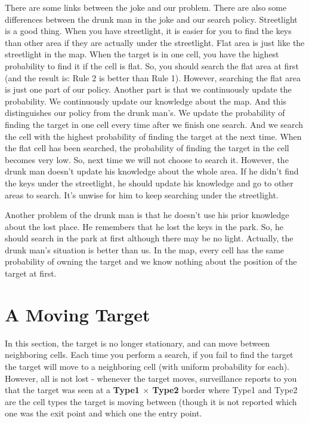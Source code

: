\documentclass[letter]{article}
\begin{document}
\begin{enumerate}
	\par{There are some links between the joke and our problem. There are also some differences between the drunk man in the joke and our search policy. Streetlight is a good thing. When you have streetlight, it is easier for you to find the keys than other area if they are actually under the streetlight. Flat area is just like the streetlight in the map. When the target is in one cell, you have the highest probability to find it if the cell is flat. So, you should search the flat area at first (and the result is: Rule 2 is better than Rule 1). However, searching the flat area is just one part of our policy. Another part is that we continuously update the probability. We continuously update our knowledge about the map. And this distinguishes our policy from the drunk man’s. We update the probability of finding the target in one cell every time after we finish one search. And we search the cell with the highest probability of finding the target at the next time. When the flat cell has been searched, the probability of finding the target in the cell becomes very low. So, next time we will not choose to search it. However, the drunk man doesn’t update his knowledge about the whole area. If he didn’t find the keys under the streetlight, he should update his knowledge and go to other areas to search. It’s unwise for him to keep searching under the streetlight.} 
	\par{Another problem of the drunk man is that he doesn’t use his prior knowledge about the lost place. He remembers that he lost the keys in the park. So, he should search in the park at first although there may be no light. Actually, the drunk man’s situation is better than us. In the map, every cell has the same probability of owning the target and we know nothing about the position of the target at first.}
	
\end{enumerate}

\section{A Moving Target}
\label{sec:A Moving Target}
\par{In this section, the target is no longer stationary, and can move between neighboring cells. Each time you perform
	a search, if you fail to find the target the target will move to a neighboring cell (with uniform probability for each).
	However, all is not lost - whenever the target moves, surveillance reports to you that the target was seen at a \textbf{Type1
	$ \times $ Type2} border where Type1 and Type2 are the cell types the target is moving between (though it is not reported
	which one was the exit point and which one the entry point. }
\end{document}
